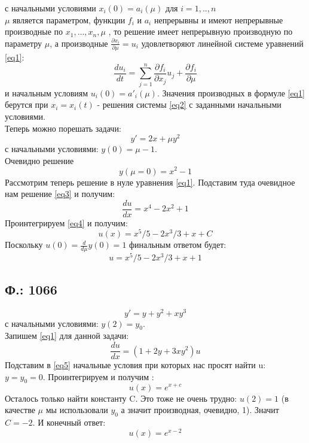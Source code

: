 \documentclass{article}
\begin{document}
с начальными условиями $x_i(0)=a_i(\mu)$ для $i=1,..,n$ \\
$\mu$ является параметром, функции $f_i$ и $a_i$ непрерывны и имеют непрерывные производные по $x_1, ... , x_n, \mu$ , то решение имеет непрерывную производную по параметру $\mu$, а производные $\frac{\partial x_i}{\partial \mu} = u_i$ удовлетворяют линейной системе уравнений \ref{eq1}:
\begin{equation}
\label{eq1}
    \frac{d u_i}{d t} = \sum_{j=1}^n \frac{\partial f_i}{\partial x_j} u_j + \frac{\partial f_i}{\partial \mu}
\end{equation}
и начальным условиям $u_i(0)=a'_i(\mu)$. Значения производных в формуле \ref{eq1} берутся при $x_i=x_i(t)$ - решения системы \ref{eq2} с заданными начальными условиями.\\

Теперь можно порешать задачи:
\begin{equation}
    y'=2x+\mu y^2
\end{equation}
с начальными условиями: $y(0)=\mu-1$. \\
Очевидно решение 
\begin{equation} \label{eq3}
    y(\mu=0)=x^2-1
\end{equation} 
Рассмотрим теперь решение в нуле уравнения \ref{eq1}. Подставим туда очевидное нам решение \ref{eq3} и получим:
\begin{equation} \label{eq4}
    \frac{d u}{d x} = x^4 - 2x^2 +1
\end{equation}
Проинтегрируем \ref{eq4} и получим:
\begin{equation}
    u(x)=x^5/5-2 x^3 /3 + x + C
\end{equation}
Поскольку $u(0)=\frac{d }{d \mu} y(0)=1$ финальным ответом будет:\\
\begin{equation}
    u=x^5/5-2 x^3 /3 + x + 1
\end{equation}
\subsection{Ф.: 1066}
\begin{equation}
    y'= y + y^2 +x y^3
\end{equation}
с начальными условиями: $y(2)=y_0$. \\
Запишем \ref{eq1} для данной задачи:
\begin{equation} \label{eq5}
    \frac{d u}{d x}=(1+2 y + 3x y^2)u
\end{equation}
Подставим в \ref{eq5} начальные условия при которых нас просят найти u: $y=y_0=0$. Проинтегрируем и получим :
\begin{equation}
    u(x)=e^{x+c}
\end{equation}
Осталось только найти константу C. Это тоже не очень трудно: $u(2)=1$ (в качестве $\mu$ мы использовали $y_0$ а значит производная, очевидно, 1). Значит $C = -2$. И конечный ответ:
\begin{equation}
u(x)=e^{x-2}
\end{equation}
\end{document}
